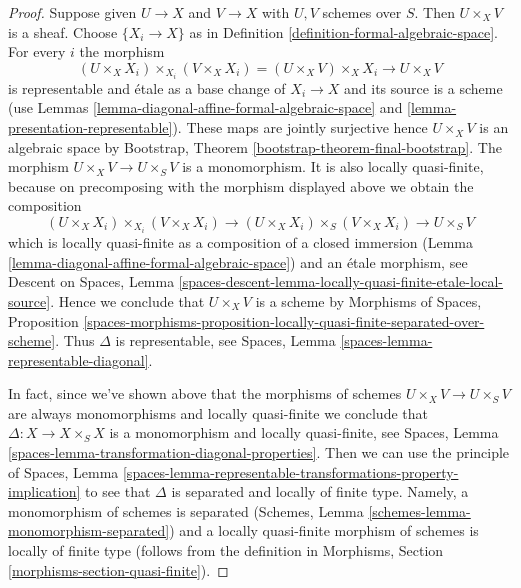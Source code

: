 \documentclass{stacks-project}
\theoremstyle{plain}
\theoremstyle{definition}
\theoremstyle{remark}
\numberwithin{equation}{subsection}
\begin{document}
\begin{proof}
Suppose given $U \to X$ and $V \to X$ with $U, V$ schemes over $S$.
Then $U \times_X V$ is a sheaf. Choose $\{X_i \to X\}$ as in
Definition \ref{definition-formal-algebraic-space}.
For every $i$ the morphism
$$
(U \times_X X_i) \times_{X_i} (V \times_X X_i)
= (U \times_X V) \times_X X_i \to U \times_X V
$$
is representable and \'etale as a base change of $X_i \to X$
and its source is a scheme (use
Lemmas \ref{lemma-diagonal-affine-formal-algebraic-space} and
\ref{lemma-presentation-representable}). These maps are jointly surjective
hence $U \times_X V$ is an algebraic space by
Bootstrap, Theorem \ref{bootstrap-theorem-final-bootstrap}.
The morphism $U \times_X V \to U \times_S V$ is a monomorphism.
It is also locally quasi-finite, because on precomposing with
the morphism displayed above we obtain the composition
$$
(U \times_X X_i) \times_{X_i} (V \times_X X_i)
\to (U \times_X X_i) \times_S (V \times_X X_i)
\to U \times_S V
$$
which is locally quasi-finite as a composition of a closed
immersion (Lemma \ref{lemma-diagonal-affine-formal-algebraic-space})
and an \'etale morphism, see
Descent on Spaces, Lemma
\ref{spaces-descent-lemma-locally-quasi-finite-etale-local-source}.
Hence we conclude that $U \times_X V$ is a scheme by
Morphisms of Spaces, Proposition
\ref{spaces-morphisms-proposition-locally-quasi-finite-separated-over-scheme}.
Thus $\Delta$ is representable, see
Spaces, Lemma \ref{spaces-lemma-representable-diagonal}.

\medskip\noindent
In fact, since we've shown above that the morphisms of schemes
$U \times_X V \to U \times_S V$ are always monomorphisms and
locally quasi-finite we conclude that $\Delta : X \to X \times_S X$
is a monomorphism and locally quasi-finite, see
Spaces, Lemma \ref{spaces-lemma-transformation-diagonal-properties}.
Then we can use the principle of
Spaces, Lemma
\ref{spaces-lemma-representable-transformations-property-implication}
to see that $\Delta$ is separated and locally of finite type.
Namely, a monomorphism of schemes is separated
(Schemes, Lemma \ref{schemes-lemma-monomorphism-separated})
and a locally quasi-finite morphism of schemes is
locally of finite type
(follows from the definition in
Morphisms, Section \ref{morphisms-section-quasi-finite}).
\end{proof}
\end{document}
